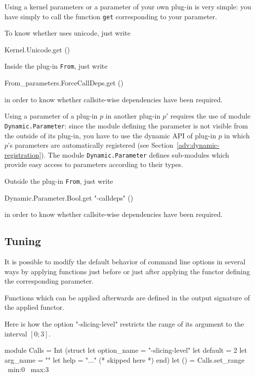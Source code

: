 Using a kernel parameters or a parameter of your own plug-in is very simple:
you have simply to call the function \texttt{get} corresponding to your
parameter.
\begin{example}
To know whether \framac uses unicode, just write
\begin{ocamlcode}
Kernel.Unicode.get ()
\end{ocamlcode}

Inside the plug-in \texttt{From}, just write
\begin{ocamlcode}
From_parameters.ForceCallDeps.get ()
\end{ocamlcode}
in order to know whether callsite-wise dependencies have been required.
\end{example}

Using a parameter of a plug-in $p$ in another plug-in $p'$ requires the use of
module \texttt{Dynamic.Parameter}: since the
module defining the parameter is not visible from the outside of its plug-in,
you have to use the dynamic API of plug-in $p$ in which $p$'s parameters are
automatically registered (see Section~\ref{adv:dynamic-registration}). The
module \texttt{Dynamic.Parameter} defines sub-modules which provide easy access
to parameters according to their \caml types.
\begin{example}
Outside the plug-in \texttt{From}, just write
\begin{ocamlcode}
Dynamic.Parameter.Bool.get "-calldeps" ()
\end{ocamlcode}
in order to know whether callsite-wise dependencies have been required.
\end{example}

\subsection{Tuning}\label{options:tuning}

It is possible to modify the default behavior of command line options in several
ways by applying functions just before or just after applying the functor
defining the corresponding parameter.

Functions which can be applied afterwards are defined in the output signature of
the applied functor.
\begin{example}
Here is how the option "-slicing-level" restricts the range of its argument to
the interval $[0;3]$.
\begin{ocamlcode}
module Calls =
  Int
    (struct
       let option_name = "-slicing-level"
       let default = 2
       let arg_name = ""
       let help = "..." (* skipped here *)
       end)
let () = Calls.set_range ~min:0 ~max:3
\end{ocamlcode}
\end{example}

